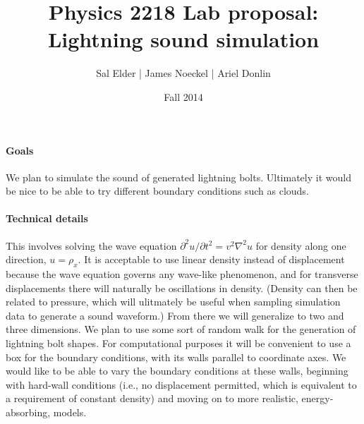 \documentclass{article}
\title{Physics 2218 Lab proposal:\\ Lightning sound simulation}
\author{Sal Elder | James Noeckel | Ariel Donlin}
\date{Fall 2014}
\begin{document}
\maketitle
\paragraph {Goals} We plan to simulate the sound of generated lightning bolts. Ultimately it would be nice to be able to try different boundary conditions such as clouds.
\paragraph {Technical details} This involves solving the wave equation $\partial ^2u/\partial t^2=v^2\nabla ^2u$ for density along one direction, $u=\rho_x.$ It is acceptable to use linear density instead of displacement because the wave equation governs any wave-like phenomenon, and for transverse displacements there will naturally be oscillations in density. (Density can then be related to pressure, which will ulitmately be useful when sampling simulation data to generate a sound waveform.) From there we will generalize to two and three dimensions. We plan to use some sort of random walk for the generation of lightning bolt shapes. For computational purposes it will be convenient to use a box for the boundary conditions, with its walls parallel to coordinate axes. We would like to be able to vary the boundary conditions at these walls, beginning with hard-wall conditions (i.e., no displacement permitted, which is equivalent to a requirement of constant density) and moving on to more realistic, energy-absorbing, models.
\end{document}

